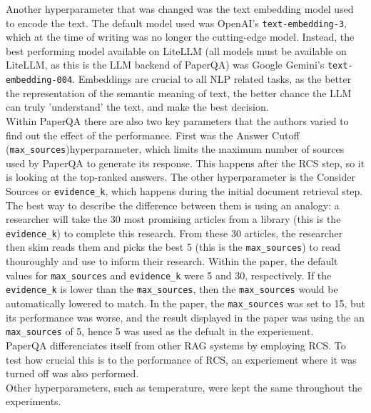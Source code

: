 Another hyperparameter that was changed was the text embedding model used to encode the text. The default model used was OpenAI's \texttt{text-embedding-3}, which at the time of writing was no longer the cutting-edge model. Instead, the best performing model available on LiteLLM (all models must be available on LiteLLM, as this is the LLM backend of PaperQA) was Google Gemini's \texttt{text-embedding-004}. Embeddings are crucial to all NLP related tasks, as the better the representation of the semantic meaning of text, the better chance the LLM can truly 'understand' the text, and make the best decision. \\

Within PaperQA there are also two key parameters that the authors varied to find out the effect of the performance. First was the Answer Cutoff (\texttt{max\_sources})hyperparameter, which limits the maximum number of sources used by PaperQA to generate its response. This happens after the RCS step, so it is looking at the top-ranked answers. The other hyperparameter is the Consider Sources or \texttt{evidence\_k}, which happens during the initial document retrieval step. The best way to describe the difference between them is using an analogy: a researcher will take the 30 most promising articles from a library (this is the \texttt{evidence\_k}) to complete this research. From these 30 articles, the researcher then skim reads them and picks the best 5 (this is the \texttt{max\_sources}) to read thouroughly and use to inform their research. Within the paper, the default values for \texttt{max\_sources} and \texttt{evidence\_k} were 5 and 30, respectively. If the \texttt{evidence\_k} is lower than the \texttt{max\_sources}, then the \texttt{max\_sources} would be automatically lowered to match. 
In the paper, the \texttt{max\_sources} was set to 15, but its performance was worse, and the result displayed in the paper was using the an \texttt{max\_sources} of 5, hence 5 was used as the defualt in the experiement.\\

PaperQA differenciates itself from other RAG systems by employing RCS. To test how crucial this is to the performance of RCS, an experiement where it was turned off was also performed. \\

Other hyperparameters, such as temperature, were kept the same throughout the experiments. \\


